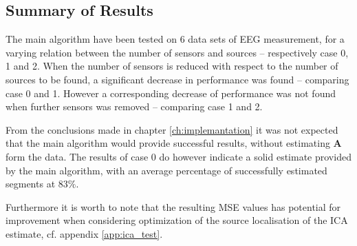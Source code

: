 

\subsection{Summary of Results}
The main algorithm have been tested on 6 data sets of EEG measurement, for a varying relation between the number of sensors and sources -- respectively case 0, 1 and 2.
When the number of sensors is reduced with respect to the number of sources to be found, a significant decrease in performance was found -- comparing case 0 and 1. 
However a corresponding decrease of performance was not found when further sensors was removed -- comparing case 1 and 2. 

From the conclusions made in chapter \ref{ch:implemantation} it was not expected that the main algorithm would provide successful results, without estimating $\textbf{A}$ form the data. 
The results of case 0 do however indicate a solid estimate provided by the main algorithm, with an average percentage of successfully estimated segments at $83\%$. 

Furthermore it is worth to note that the resulting MSE values has potential for improvement when considering optimization of the source localisation of the ICA estimate, cf. appendix \ref{app:ica_test}.





